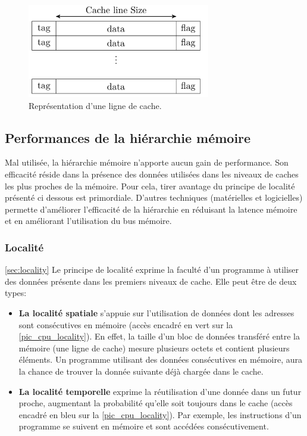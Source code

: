 \begin{figure}
    \center
    \includegraphics[width=8cm]{images/cacheline_def.png}
    \caption{\label{pic:cacheline} Représentation d'une ligne de cache.}
\end{figure}


\subsection{Performances de la hiérarchie mémoire}

Mal utilisée, la hiérarchie mémoire n'apporte aucun gain de performance. Son efficacité réside dans la présence des données utilisées dans les niveaux de caches les plus proches de la mémoire. Pour cela, tirer avantage du principe de localité présenté ci dessous est primordiale. D'autres techniques (matérielles et logicielles) permette d'améliorer l'efficacité de la hiérarchie en réduisant la latence mémoire et en améliorant l'utilisation du bus mémoire. 


\subsubsection{Localité}\autoref{sec:locality}
Le principe de localité exprime la faculté d'un programme à utiliser des données présente dans les premiers niveaux de cache. Elle peut être de deux types:
\begin{itemize}
    \item \textbf{La localité spatiale} s'appuie sur l'utilisation de données dont les adresses sont consécutives en mémoire (accès encadré en vert sur la \autoref{pic_cpu_locality}). En effet, la taille d'un bloc de données transféré entre la mémoire (une ligne de cache) mesure plusieurs octets et contient plusieurs éléments. Un programme utilisant des données consécutives en mémoire, aura la chance de trouver la donnée suivante déjà chargée dans le cache. 
    \item \textbf{La localité temporelle} exprime la réutilisation d'une donnée dans un futur proche, augmentant la probabilité qu'elle soit toujours dans le cache (accès encadré en bleu sur la \autoref{pic_cpu_locality}). Par exemple, les instructions d'un programme se suivent en mémoire et sont accédées consécutivement. 

\end{itemize}


